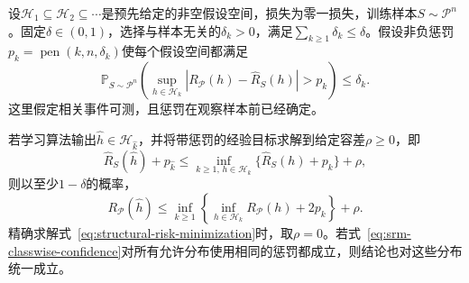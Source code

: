 \begin{theorem}[结构风险最小化的期望风险保证]
\label{thm:srm-oracle-bound}
设$\mathcal H_1\subseteq\mathcal H_2\subseteq\cdots$是预先给定的非空假设空间，损失为零一损失，训练样本$S\sim\mathcal P^n$。固定$\delta\in(0,1)$，选择与样本无关的$\delta_k>0$，满足$\sum_{k\geq1}\delta_k\leq\delta$。假设非负惩罚$p_k=\operatorname{pen}(k,n,\delta_k)$使每个假设空间都满足
\begin{equation}
 \mathbb P_{S\sim\mathcal P^n}\left(
 \sup_{h\in\mathcal H_k}
 |R_{\mathcal P}(h)-\hat R_S(h)|>p_k
 \right)\leq\delta_k.
 \label{eq:srm-classwise-confidence}
\end{equation}
这里假定相关事件可测，且惩罚在观察样本前已经确定。

若学习算法输出$\hat h\in\mathcal H_{\hat k}$，并将带惩罚的经验目标求解到给定容差$\rho\geq0$，即
\begin{equation}
 \hat R_S(\hat h)+p_{\hat k}
 \leq\inf_{k\geq1,\,h\in\mathcal H_k}
       \{\hat R_S(h)+p_k\}+\rho,
 \label{eq:srm-approximate-minimizer}
\end{equation}
则以至少$1-\delta$的概率，
\begin{equation}
 R_{\mathcal P}(\hat h)
 \leq\inf_{k\geq1}\left\{
       \inf_{h\in\mathcal H_k}R_{\mathcal P}(h)+2p_k
       \right\}+\rho.
 \label{eq:srm-oracle}
\end{equation}
精确求解式~\eqref{eq:structural-risk-minimization}时，取$\rho=0$。若式~\eqref{eq:srm-classwise-confidence}对所有允许分布使用相同的惩罚都成立，则结论也对这些分布统一成立。
\end{theorem}

